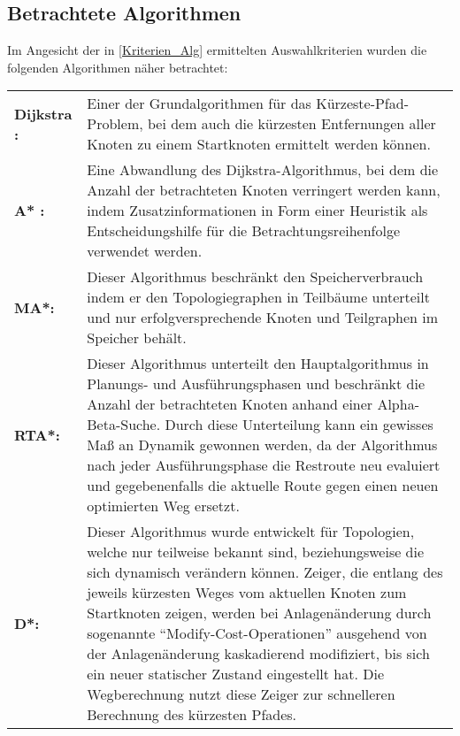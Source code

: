 	\subsection{Betrachtete Algorithmen}
		\label{Betrachtete_Algorithmen}
		Im Angesicht der in \ref{Kriterien_Alg} ermittelten Auswahlkriterien wurden die folgenden Algorithmen näher betrachtet:
		
		\begin{longtable}{p{2.5cm} p{10cm}}
			
			\textbf{Dijkstra :} & Einer der Grundalgorithmen für das Kürzeste-Pfad-Problem, bei dem auch die kürzesten Entfernungen aller Knoten zu einem Startknoten ermittelt werden können.\\[0.5cm]
			\textbf{A* :} & Eine Abwandlung des Dijkstra-Algorithmus, bei dem die Anzahl der betrachteten Knoten verringert werden kann, indem Zusatzinformationen in Form einer Heuristik als Entscheidungshilfe für die Betrachtungsreihenfolge verwendet werden.\\[0.5cm]
			\textbf{\ac{MA*}\cite{Chakrabarti1989}:} &	Dieser Algorithmus beschränkt den Speicherverbrauch indem er den Topologiegraphen in Teilbäume unterteilt und nur erfolgversprechende Knoten und Teilgraphen im Speicher behält.\\[0.5cm]
			\textbf{\ac{RTA*}\cite{Korf1990}:} & Dieser Algorithmus unterteilt den Hauptalgorithmus in  Planungs- und Ausführungsphasen und beschränkt die Anzahl der betrachteten Knoten anhand einer Alpha-Beta-Suche. Durch diese Unterteilung kann ein gewisses Maß an Dynamik gewonnen werden, da der Algorithmus nach jeder Ausführungsphase die Restroute neu evaluiert und gegebenenfalls die aktuelle Route gegen einen neuen optimierten Weg ersetzt.\\[0.5cm]
			\textbf{\ac{D*}\cite{DStarAlg}\cite{Koenig2005}:} & Dieser Algorithmus wurde entwickelt für Topologien, welche nur teilweise bekannt sind, beziehungsweise die sich dynamisch verändern können. Zeiger, die entlang des jeweils kürzesten Weges vom aktuellen Knoten zum Startknoten zeigen, werden bei Anlagenänderung durch sogenannte "`Modify-Cost-Operationen"' ausgehend von der Anlagenänderung kaskadierend modifiziert, bis sich ein neuer statischer Zustand eingestellt hat. Die Wegberechnung nutzt diese Zeiger zur schnelleren Berechnung des kürzesten Pfades.\\[0.5cm]
			
		\end{longtable}
		
